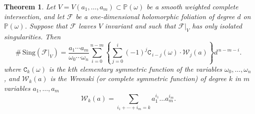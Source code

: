 \documentclass[11pt]{amsart}
\theoremstyle{plain}
\newtheorem{teo}{Theorem}[section]
\theoremstyle{definition}
\begin{document}
\begin{teo} \label{teo1} 
Let $V=V(a_1,\ldots,a_m)\subset\mathbb{P}(\omega)$ be a smooth weighted complete intersection, and 
let $\mathcal{F}$ be a one-dimensional holomorphic foliation of degree $d$ on $\mathbb{P}(\omega)$.
Suppose that $\mathcal{F}$ leaves $V$ invariant and such that $\mathcal{F}|_V$ has only isolated singularities. 
Then 
$$\#\,\mathrm{Sing}(\mathcal{F}|_V)
=\frac{a_1\cdots a_m}{\omega_0\cdots\omega_n}\sum_{i=0}^{n-m}
\left\{\sum_{j=0}^i(-1)^j\texttt{C}_{\,i-j}(\omega)\cdot\mathcal{W}_j(a)\right\}d^{\,n-m-i}.$$
where $\texttt{C}_{k}(\omega)$ is the $k$th elementary symmetric function
of the variables $\omega_0,\ldots, \omega_{n}$, and $\mathcal{W}_k(a)$ is the Wronski (or complete symmetric function)
of degree $k$ in $m$ variables $a_1,\ldots,a_m$
$$\mathcal{W}_k(a)=\sum_{i_1+\cdots+i_m=k}a_1^{i_1}\ldots a_m^{i_m}.$$ 
\end{teo}
\end{document}

